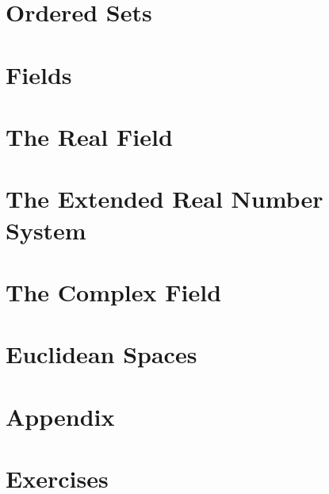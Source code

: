 \section{Ordered Sets}\label{sec:1.2}


\section{Fields}\label{sec:1.3}


\section{The Real Field}\label{sec:1.4}


\section{The Extended Real Number System}\label{sec:1.5}


\section{The Complex Field}\label{sec:1.6}


\section{Euclidean Spaces}\label{sec:1.7}


\section{Appendix}\label{sec:1.A}


\section{Exercises}\label{sec:1.E}





